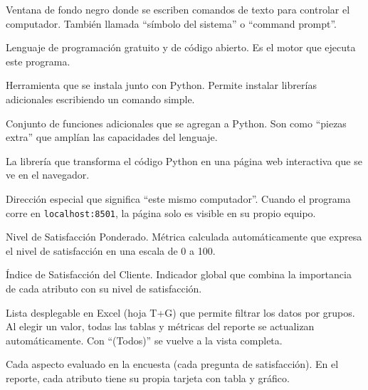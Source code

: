 \documentclass[12pt, letterpaper]{article}
\begin{document}
\begin{description}[leftmargin=2.5cm, style=nextline]
  \item[\textcolor{uninorteazul}{Terminal / Consola}]
    Ventana de fondo negro donde se escriben comandos de texto para controlar el computador. También llamada ``símbolo del sistema'' o ``command prompt''.

  \item[\textcolor{uninorteazul}{Python}]
    Lenguaje de programación gratuito y de código abierto. Es el motor que ejecuta este programa.

  \item[\textcolor{uninorteazul}{pip}]
    Herramienta que se instala junto con Python. Permite instalar librerías adicionales escribiendo un comando simple.

  \item[\textcolor{uninorteazul}{Librería / Módulo}]
    Conjunto de funciones adicionales que se agregan a Python. Son como ``piezas extra'' que amplían las capacidades del lenguaje.

  \item[\textcolor{uninorteazul}{Streamlit}]
    La librería que transforma el código Python en una página web interactiva que se ve en el navegador.

  \item[\textcolor{uninorteazul}{localhost}]
    Dirección especial que significa ``este mismo computador''. Cuando el programa corre en \texttt{localhost:8501}, la página solo es visible en su propio equipo.

  \item[\textcolor{uninorteazul}{NSP}]
    Nivel de Satisfacción Ponderado. Métrica calculada automáticamente que expresa el nivel de satisfacción en una escala de 0 a 100.

  \item[\textcolor{uninorteazul}{ISC}]
    Índice de Satisfacción del Cliente. Indicador global que combina la importancia de cada atributo con su nivel de satisfacción.

  \item[\textcolor{uninorteazul}{Filtro dinámico / Segmentador}]
    Lista desplegable en Excel (hoja T+G) que permite filtrar los datos por grupos. Al elegir un valor, todas las tablas y métricas del reporte se actualizan automáticamente. Con ``(Todos)'' se vuelve a la vista completa.

  \item[\textcolor{uninorteazul}{Atributo}]
    Cada aspecto evaluado en la encuesta (cada pregunta de satisfacción). En el reporte, cada atributo tiene su propia tarjeta con tabla y gráfico.


\end{description}
\end{document}
